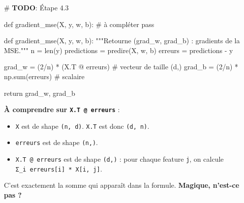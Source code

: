 \documentclass[
  french,
  11pt,
  a4paper,
]{scrbook}
\newenvironment{Shaded}{}{}
\newcommand{\AlertTok}[1]{\textcolor[rgb]{1.00,0.33,0.33}{\textbf{#1}}}
\newcommand{\BuiltInTok}[1]{\textcolor[rgb]{0.84,0.23,0.29}{#1}}
\newcommand{\CommentTok}[1]{\textcolor[rgb]{0.42,0.45,0.49}{#1}}
\newcommand{\ControlFlowTok}[1]{\textcolor[rgb]{0.84,0.23,0.29}{#1}}
\newcommand{\DecValTok}[1]{\textcolor[rgb]{0.00,0.36,0.77}{#1}}
\newcommand{\KeywordTok}[1]{\textcolor[rgb]{0.84,0.23,0.29}{#1}}
\newcommand{\NormalTok}[1]{\textcolor[rgb]{0.14,0.16,0.18}{#1}}
\newcommand{\OperatorTok}[1]{\textcolor[rgb]{0.14,0.16,0.18}{#1}}
\providecommand{\tightlist}{%
  \setlength{\itemsep}{0pt}\setlength{\parskip}{0pt}}
\begin{document}
\begin{Shaded}
\begin{Highlighting}[]
\CommentTok{\# }\AlertTok{TODO}\CommentTok{: Étape 4.3}

\KeywordTok{def}\NormalTok{ gradient\_mse(X, y, w, b):}
    \CommentTok{\# à compléter}
    \ControlFlowTok{pass}
\end{Highlighting}
\end{Shaded}

\begin{tcolorbox}[enhanced jigsaw, arc=.35mm, bottomrule=.15mm, bottomtitle=1mm, breakable, colback=white, colbacktitle=quarto-callout-tip-color!10!white, colframe=quarto-callout-tip-color-frame, coltitle=black, left=2mm, leftrule=.75mm, opacityback=0, opacitybacktitle=0.6, rightrule=.15mm, title=\textcolor{quarto-callout-tip-color}{\faLightbulb}\hspace{0.5em}{✅ Corrigé Étape 4.3}, titlerule=0mm, toprule=.15mm, toptitle=1mm]

\begin{Shaded}
\begin{Highlighting}[]
\KeywordTok{def}\NormalTok{ gradient\_mse(X, y, w, b):}
    \CommentTok{"""Retourne (grad\_w, grad\_b) : gradients de la MSE."""}
\NormalTok{    n }\OperatorTok{=} \BuiltInTok{len}\NormalTok{(y)}
\NormalTok{    predictions }\OperatorTok{=}\NormalTok{ predire(X, w, b)}
\NormalTok{    erreurs }\OperatorTok{=}\NormalTok{ predictions }\OperatorTok{{-}}\NormalTok{ y}
    
\NormalTok{    grad\_w }\OperatorTok{=}\NormalTok{ (}\DecValTok{2}\OperatorTok{/}\NormalTok{n) }\OperatorTok{*}\NormalTok{ (X.T }\OperatorTok{@}\NormalTok{ erreurs)  }\CommentTok{\# vecteur de taille (d,)}
\NormalTok{    grad\_b }\OperatorTok{=}\NormalTok{ (}\DecValTok{2}\OperatorTok{/}\NormalTok{n) }\OperatorTok{*}\NormalTok{ np.}\BuiltInTok{sum}\NormalTok{(erreurs)  }\CommentTok{\# scalaire}
    
    \ControlFlowTok{return}\NormalTok{ grad\_w, grad\_b}
\end{Highlighting}
\end{Shaded}

\textbf{À comprendre sur \texttt{X.T\ @\ erreurs}} :

\begin{itemize}
\tightlist
\item
  \texttt{X} est de shape \texttt{(n,\ d)}. \texttt{X.T} est donc
  \texttt{(d,\ n)}.
\item
  \texttt{erreurs} est de shape \texttt{(n,)}.
\item
  \texttt{X.T\ @\ erreurs} est de shape \texttt{(d,)} : pour chaque
  feature \texttt{j}, on calcule
  \texttt{Σ\_i\ erreurs{[}i{]}\ *\ X{[}i,\ j{]}}.
\end{itemize}

C'est exactement la somme qui apparaît dans la formule. \textbf{Magique,
n'est-ce pas ?}

\end{tcolorbox}
\end{document}

